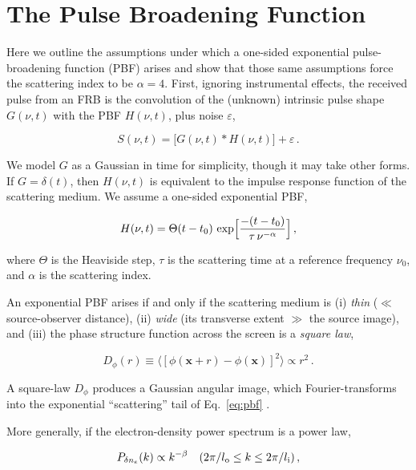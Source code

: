 \documentclass[twocolumn, linenumbers, tra]{aastex631}
\newcommand{\rev}[1]{{\color{purple}#1}}
\begin{document}
\rev{
\section{The Pulse Broadening Function}\label{apA}

Here we outline the assumptions under which a one-sided exponential pulse-broadening function (PBF) arises and show that those same assumptions force the scattering index to be $\alpha = 4$. First, ignoring instrumental effects, the received pulse from an FRB is the convolution of the (unknown) intrinsic pulse shape $G(\nu,t)$ with the PBF $H(\nu,t)$, plus noise $\varepsilon$,

\begin{equation}\label{eq:pulse}
 S(\nu,t)=\bigl[G(\nu,t)\ast H(\nu,t)\bigr]+\varepsilon\,.
\end{equation}

We model $G$ as a Gaussian in time for simplicity, though it may take other forms. If $G = \delta(t)$, then $H(\nu,t)$ is equivalent to the impulse response function of the scattering medium. We assume a one-sided exponential PBF, 

\begin{equation}\label{eq:pbf}
 H(\nu,t)=\Theta(t-t_0)\,\exp\Bigl[\frac{-(t-t_0)}{\tau\,\nu^{-\alpha}}\Bigr]\,,
\end{equation}

where $\Theta$ is the Heaviside step, $\tau$ is the scattering time at a reference frequency $\nu_0$, and $\alpha$ is the scattering index.

An exponential PBF arises if and only if the scattering medium is (i) \emph{thin} ($\ll$ source-observer distance), (ii) \emph{wide} (its transverse extent $\gg$ the source image), and (iii) the phase structure function across the screen is a \emph{square law}, 

\begin{equation}\label{eq:strfunc}
  D_\phi(r)\equiv\bigl\langle[\phi(\mathbf{x}+r)-\phi(\mathbf{x})]^2\bigr\rangle\propto r^2\,.
\end{equation}

A square-law $D_\phi$ produces a Gaussian angular image, which Fourier-transforms into the exponential ``scattering'' tail of Eq.~\ref{eq:pbf} \citep{Lee1975b}.

More generally, if the electron-density power spectrum is a power law, 

\begin{equation}
  P_{\delta n_e}(k)\propto k^{-\beta}\quad(2\pi/l_{\rm o}\le k\le2\pi/l_{\rm i})\,,
\end{equation}

}
\end{document}
